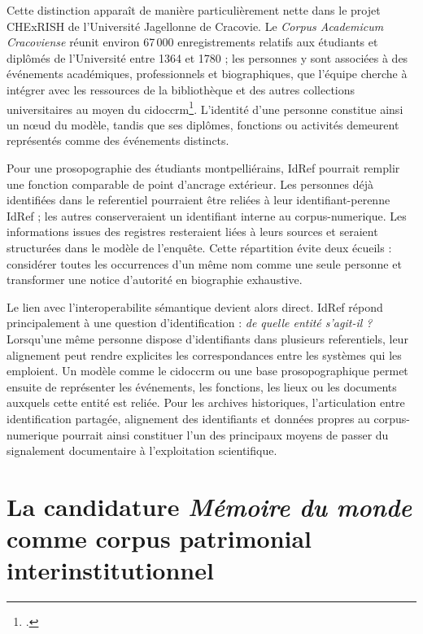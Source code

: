 Cette distinction apparaît de manière particulièrement nette dans le projet CHExRISH de l'Université Jagellonne de Cracovie. Le \emph{Corpus Academicum Cracoviense} réunit environ 67\,000 enregistrements relatifs aux étudiants et diplômés de l'Université entre 1364 et 1780 ; les personnes y sont associées à des événements académiques, professionnels et biographiques, que l'équipe cherche à intégrer avec les ressources de la bibliothèque et des autres collections universitaires au moyen du \gls{cidoccrm}\footcite{DoValleMirandaKuttNalepa2025}. L'identité d'une personne constitue ainsi un nœud du modèle, tandis que ses diplômes, fonctions ou activités demeurent représentés comme des événements distincts.

Pour une prosopographie des étudiants montpelliérains, IdRef pourrait remplir une fonction comparable de point d'ancrage extérieur. Les personnes déjà identifiées dans le \gls{referentiel} pourraient être reliées à leur \gls{identifiant-perenne} IdRef ; les autres conserveraient un identifiant interne au \gls{corpus-numerique}. Les informations issues des registres resteraient liées à leurs sources et seraient structurées dans le modèle de l'enquête. Cette répartition évite deux écueils : considérer toutes les occurrences d'un même nom comme une seule personne et transformer une notice d'autorité en biographie exhaustive.

Le lien avec l'\gls{interoperabilite} sémantique devient alors direct. IdRef répond principalement à une question d'identification : \emph{de quelle entité s'agit-il ?} Lorsqu'une même personne dispose d'identifiants dans plusieurs \glspl{referentiel}, leur \gls{alignement} peut rendre explicites les correspondances entre les systèmes qui les emploient. Un modèle comme le \gls{cidoccrm} ou une base prosopographique permet ensuite de représenter les événements, les fonctions, les lieux ou les documents auxquels cette entité est reliée. Pour les archives historiques, l'articulation entre identification partagée, \gls{alignement} des identifiants et données propres au \gls{corpus-numerique} pourrait ainsi constituer l'un des principaux moyens de passer du \gls{signalement} documentaire à l'exploitation scientifique.



\section{La candidature \emph{Mémoire du monde} comme corpus patrimonial interinstitutionnel}

